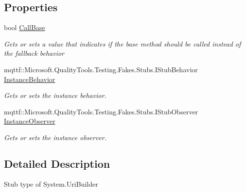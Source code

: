 \subsection*{Properties}
\begin{DoxyCompactItemize}
\item 
bool \hyperlink{class_system_1_1_fakes_1_1_stub_uri_builder_adc55e7b794d86bfdfaa8cf0a1ba52830}{Call\-Base}
\begin{DoxyCompactList}\small\item\em Gets or sets a value that indicates if the base method should be called instead of the fallback behavior\end{DoxyCompactList}\item 
mqttf\-::\-Microsoft.\-Quality\-Tools.\-Testing.\-Fakes.\-Stubs.\-I\-Stub\-Behavior \hyperlink{class_system_1_1_fakes_1_1_stub_uri_builder_a2c9c65e5522ddc4a82e288f932d098cc}{Instance\-Behavior}
\begin{DoxyCompactList}\small\item\em Gets or sets the instance behavior.\end{DoxyCompactList}\item 
mqttf\-::\-Microsoft.\-Quality\-Tools.\-Testing.\-Fakes.\-Stubs.\-I\-Stub\-Observer \hyperlink{class_system_1_1_fakes_1_1_stub_uri_builder_a42737b0926707cc40bb40cc7aa1737ba}{Instance\-Observer}
\begin{DoxyCompactList}\small\item\em Gets or sets the instance observer.\end{DoxyCompactList}\end{DoxyCompactItemize}


\subsection{Detailed Description}
Stub type of System.\-Uri\-Builder



